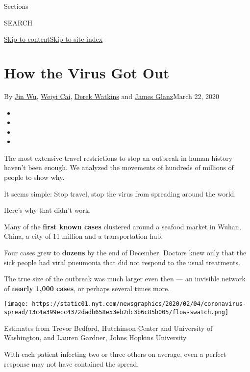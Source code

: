 Sections

SEARCH

\protect\hyperlink{site-content}{Skip to
content}\protect\hyperlink{site-index}{Skip to site index}

\hypertarget{how-the-virus-got-out}{%
\section{How the Virus Got Out}\label{how-the-virus-got-out}}

By \href{https://www.nytimes.com/by/jin-wu}{Jin Wu},
\href{https://www.nytimes.com/by/weiyi-cai}{Weiyi Cai},
\href{https://www.nytimes.com/by/derek-watkins}{Derek Watkins} and
\href{https://www.nytimes.com/by/james-glanz}{James Glanz}March 22, 2020

\begin{itemize}
\item
\item
\item
\item
\end{itemize}

The most extensive travel restrictions to stop an outbreak in human
history haven't been enough. We analyzed the movements of hundreds of
millions of people to show why.

It seems simple: Stop travel, stop the virus from spreading around the
world.

Here's why that didn't work.

Many of the \textbf{first known cases} clustered around a seafood market
in Wuhan, China, a city of 11 million and a transportation hub.

Four cases grew to \textbf{dozens} by the end of December. Doctors knew
only that the sick people had viral pneumonia that did not respond to
the usual treatments.

The true size of the outbreak was much larger even then --- an invisible
network of \textbf{nearly 1,000 cases}, or perhaps several times more.

\texttt{[image: https://static01.nyt.com/newsgraphics/2020/02/04/coronavirus-spread/13c4a399ecc4372dadb658e53eb2dc3b6c85b005/flow-swatch.png]}

Estimates from Trevor Bedford, Hutchinson Center and University of
Washington, and Lauren Gardner, Johns Hopkins University

With each patient infecting two or three others on average, even a
perfect response may not have contained the spread.

